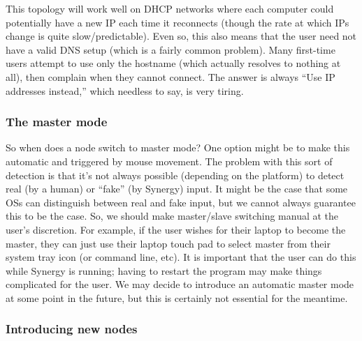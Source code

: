 This topology will work well on DHCP networks where
each computer could potentially have a new IP each time it reconnects (though
the rate at which IPs change is quite slow/predictable). Even so, this also 
means that the user need not have a valid DNS setup (which is a fairly common
problem). Many first-time users attempt to use only the hostname (which actually
resolves to nothing at all), then complain when they cannot connect. The answer
is always ``Use IP addresses instead,'' which needless to say, is very tiring.

\subsubsection{The master mode}

So when does a node switch to master mode? One option might be to make this
automatic and triggered by mouse movement. The problem with this sort of
detection is that it's not always possible (depending on the platform) to
detect real (by a human) or ``fake'' (by Synergy) input. It might be the
case that some OSs can distinguish between real and fake input, but we cannot
always guarantee this to be the case. So, we should make master/slave switching
manual at the user's discretion. For example, if the user wishes for their
laptop to become the master, they can just use their laptop touch pad to
select master from their system tray icon (or command line, etc). It is
important that the user can do this while Synergy is running; having to restart
the program may make things complicated for the user. We may decide to 
introduce an automatic master mode at some point in the future, but this is
certainly not essential for the meantime.

\subsubsection{Introducing new nodes}


